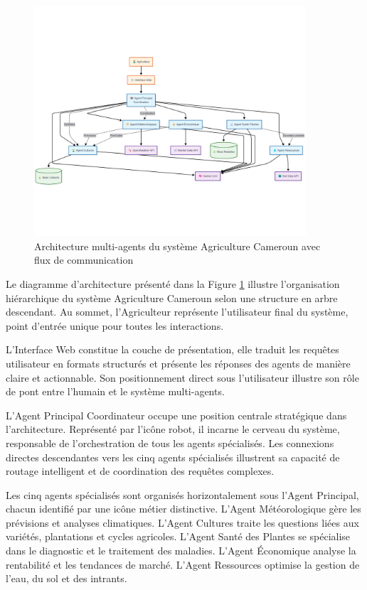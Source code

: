 \begin{figure}[H]
\centering
\includegraphics[width=0.9\textwidth]{images/architectures.png}
\caption{Architecture multi-agents du système Agriculture Cameroun avec flux de communication}
\label{fig:architecture}
\end{figure}

Le diagramme d'architecture présenté dans la Figure \ref{fig:architecture} illustre l'organisation hiérarchique du système Agriculture Cameroun selon une structure en arbre descendant. Au sommet, l'Agriculteur représente l'utilisateur final du système, point d'entrée unique pour toutes les interactions.

L'Interface Web constitue la couche de présentation, elle traduit les requêtes utilisateur en formats structurés et présente les réponses des agents de manière claire et actionnable. Son positionnement direct sous l'utilisateur illustre son rôle de pont entre l'humain et le système multi-agents.

L'Agent Principal Coordinateur occupe une position centrale stratégique dans l'architecture. Représenté par l'icône robot, il incarne le cerveau du système, responsable de l'orchestration de tous les agents spécialisés. Les connexions directes descendantes vers les cinq agents spécialisés illustrent sa capacité de routage intelligent et de coordination des requêtes complexes.

Les cinq agents spécialisés sont organisés horizontalement sous l'Agent Principal, chacun identifié par une icône métier distinctive. L'Agent Météorologique gère les prévisions et analyses climatiques. L'Agent Cultures traite les questions liées aux variétés, plantations et cycles agricoles. L'Agent Santé des Plantes se spécialise dans le diagnostic et le traitement des maladies. L'Agent Économique  analyse la rentabilité et les tendances de marché. L'Agent Ressources optimise la gestion de l'eau, du sol et des intrants.

